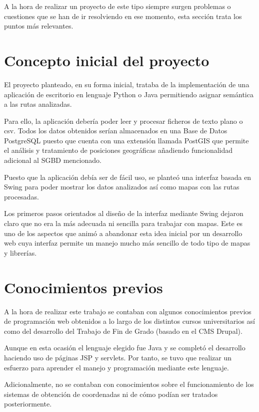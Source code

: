 
A la hora de realizar un proyecto de este tipo siempre surgen problemas o cuestiones que se han de ir resolviendo en ese momento, esta sección trata los puntos más relevantes.

\section{Concepto inicial del proyecto}
El proyecto planteado, en su forma inicial, trataba de la implementación de una aplicación de escritorio en lenguaje Python o Java permitiendo asignar semántica a las rutas analizadas.

Para ello, la aplicación debería poder leer y procesar ficheros de texto plano o csv. Todos los datos obtenidos serían almacenados en una Base de Datos PostgreSQL puesto que cuenta con una extensión llamada PostGIS que permite el análisis y tratamiento de posiciones geográficas añadiendo funcionalidad adicional al SGBD mencionado.

Puesto que la aplicación debía ser de fácil uso, se planteó una interfaz basada en Swing para poder mostrar los datos analizados así como mapas con las rutas procesadas.

Los primeros pasos orientados al diseño de la interfaz mediante Swing dejaron claro que no era la más adecuada ni sencilla para trabajar con mapas. Este es uno de los aspectos que animó a abandonar esta idea inicial por un desarrollo web cuya interfaz permite un manejo mucho más sencillo de todo tipo de mapas y librerías.

\section{Conocimientos previos}
A la hora de realizar este trabajo se contaban con algunos conocimientos previos  de programación web obtenidos a lo largo de los distintos cursos universitarios así como del desarrollo del Trabajo de Fin de Grado (basado en el CMS Drupal).

Aunque en esta ocasión el lenguaje elegido fue Java y se completó el desarrollo haciendo uso de páginas JSP y servlets. Por tanto, se tuvo que realizar un esfuerzo para aprender el manejo y programación mediante este lenguaje.

Adicionalmente, no se contaban con conocimientos sobre el funcionamiento de los sistemas de obtención de coordenadas ni de cómo podían ser tratados posteriormente.


